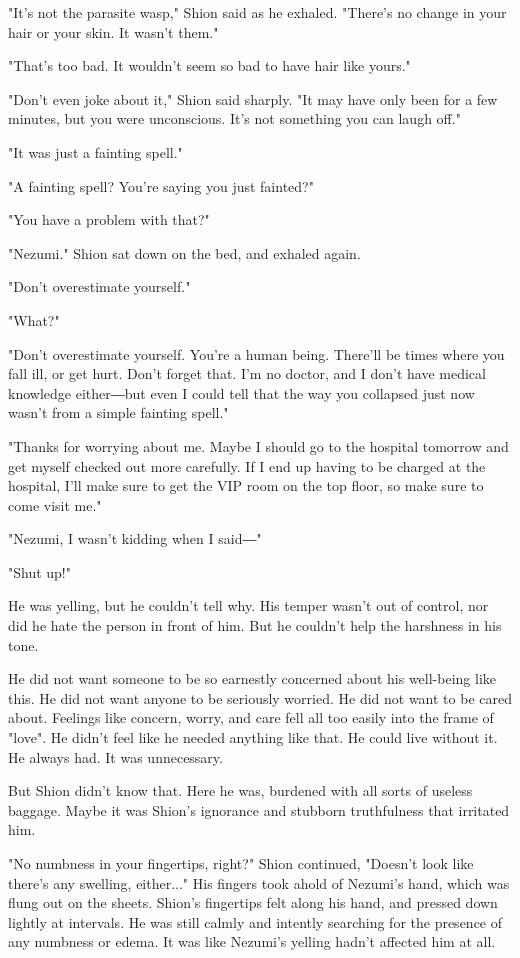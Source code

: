 "It's not the parasite wasp," Shion said as he exhaled. "There's no
change in your hair or your skin. It wasn't them."

"That's too bad. It wouldn't seem so bad to have hair like yours."

"Don't even joke about it," Shion said sharply. "It may have only been
for a few minutes, but you were unconscious. It's not something you can
laugh off."

"It was just a fainting spell."

"A fainting spell? You're saying you just fainted?"

"You have a problem with that?"

"Nezumi." Shion sat down on the bed, and exhaled again.

"Don't overestimate yourself."

"What?"

"Don't overestimate yourself. You're a human being. There'll be times
where you fall ill, or get hurt. Don't forget that. I'm no doctor, and I
don't have medical knowledge either―but even I could tell that the way
you collapsed just now wasn't from a simple fainting spell."

"Thanks for worrying about me. Maybe I should go to the hospital
tomorrow and get myself checked out more carefully. If I end up having
to be charged at the hospital, I'll make sure to get the VIP room on the
top floor, so make sure to come visit me."

"Nezumi, I wasn't kidding when I said―"

"Shut up!"

He was yelling, but he couldn't tell why. His temper wasn't out of
control, nor did he hate the person in front of him. But he couldn't
help the harshness in his tone.

He did not want someone to be so earnestly concerned about his
well-being like this. He did not want anyone to be seriously worried. He
did not want to be cared about. Feelings like concern, worry, and care
fell all too easily into the frame of "love". He didn't feel like he
needed anything like that. He could live without it. He always had. It
was unnecessary.

But Shion didn't know that. Here he was, burdened with all sorts of
useless baggage. Maybe it was Shion's ignorance and stubborn
truthfulness that irritated him.

"No numbness in your fingertips, right?" Shion continued, "Doesn't look
like there's any swelling, either..." His fingers took ahold of Nezumi's
hand, which was flung out on the sheets. Shion's fingertips felt along
his hand, and pressed down lightly at intervals. He was still calmly and
intently searching for the presence of any numbness or edema. It was
like Nezumi's yelling hadn't affected him at all.

